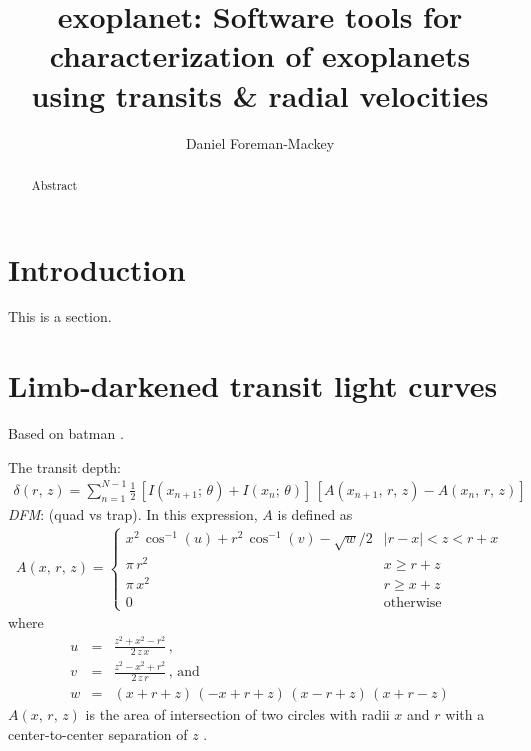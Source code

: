 \documentclass[modern]{aastex62}
\newcommand{\project}[1]{\textsf{#1}}
\newcommand{\todo}[3]{{\color{#2}\emph{#1}: #3}}
\newcommand{\dfmtodo}[1]{\todo{DFM}{red}{#1}}
\begin{document}
\raggedbottom\sloppy\sloppypar\frenchspacing

\title{%
\project{exoplanet}: Software tools for characterization of exoplanets using
transits \& radial velocities
}

\author[0000-0002-9328-5652]{Daniel Foreman-Mackey}

\begin{abstract}
Abstract
\end{abstract}


\section{Introduction}

This is a section.

\section{Limb-darkened transit light curves}

Based on \project{batman} \citep{Kreidberg:2015}.

The transit depth:
\begin{eqnarray}
\delta(r,\,z) = \sum_{n=1}^{N-1} \frac{1}{2}\,\left[I(x_{n+1};\,\theta) +
I(x_n;\,\theta)\right]\,
\left[A(x_{n+1},\,r,\,z) - A(x_n,\,r,\,z)\right]
\end{eqnarray}
\dfmtodo{(quad vs trap)}.
In this expression, $A$ is defined as
\begin{eqnarray}
A(x,\,r,\,z) = \left\{\begin{array}{ll}
x^2\,\cos^{-1}(u)+r^2\,\cos^{-1}(v)-\sqrt{w}/2 &
    \left|r-x\right| < z < r + x \\
\pi\,r^2 & x \ge r + z \\
\pi\,x^2 & r \ge x + z \\
0 & \mathrm{otherwise}
\end{array}\right.
\end{eqnarray}
where
\begin{eqnarray}
u &=& \frac{z^2+x^2-r^2}{2\,z\,x} \,,\\
v &=& \frac{z^2-x^2+r^2}{2\,z\,r} \,,\,\mathrm{and}\\
w &=& (x+r+z)\,(-x+r+z)\,(x-r+z)\,(x+r-z)
\end{eqnarray}
$A(x,\,r,\,z)$ is the area of intersection of two circles with radii $x$ and
$r$ with a center-to-center separation of $z$ \citep{Mandel:2002,
Kreidberg:2015}.
\end{document}
